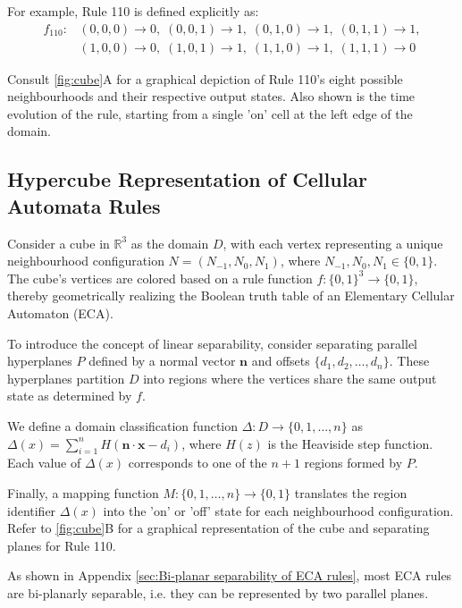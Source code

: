 For example, Rule 110 is defined explicitly as:
\[
\begin{array}{ll}
f_{\text{110}}: & (0,0,0) \to 0, \; (0,0,1) \to 1, \; (0,1,0) \to 1, \; (0,1,1) \to 1, \\
& (1,0,0) \to 0, \; (1,0,1) \to 1, \; (1,1,0) \to 1, \; (1,1,1) \to 0
\end{array}
\]

Consult \autoref{fig:cube}A for a graphical depiction of Rule 110's eight possible neighbourhoods and their respective output states. Also shown is the time evolution of the rule, starting from a single 'on' cell at the left edge of the domain.

\subsection*{Hypercube Representation of Cellular Automata Rules}
Consider a cube in \( \mathbb{R}^3 \) as the domain \( D \), with each vertex representing a unique neighbourhood configuration \( N = (N_{-1}, N_0, N_1) \), where \( N_{-1}, N_0, N_1 \in \{0, 1\} \). The cube's vertices are colored based on a rule function \( f: \{0, 1\}^3 \to \{0, 1\} \), thereby geometrically realizing the Boolean truth table of an Elementary Cellular Automaton (ECA).

To introduce the concept of linear separability, consider separating parallel hyperplanes \( P \) defined by a normal vector \( \mathbf{n} \) and offsets \( \{d_1, d_2, \ldots, d_n\} \). These hyperplanes partition \( D \) into regions where the vertices share the same output state as determined by \( f \).

We define a domain classification function \( \Delta: D \to \{0, 1, \ldots, n\} \) as \( \Delta(x) = \sum_{i=1}^{n} H(\mathbf{n} \cdot \mathbf{x} - d_i) \), where \( H(z) \) is the Heaviside step function. Each value of \( \Delta(x) \) corresponds to one of the \( n+1 \) regions formed by \( P \).

Finally, a mapping function \( M: \{0, 1, \ldots, n\} \to \{0, 1\} \) translates the region identifier \( \Delta(x) \) into the 'on' or 'off' state for each neighbourhood configuration.
Refer to \autoref*{fig:cube}B for a graphical representation of the cube and separating planes for Rule 110.

As shown in Appendix \ref*{sec:Bi-planar separability of ECA rules}, most ECA rules are bi-planarly separable, i.e. they can be represented by two parallel planes. 


